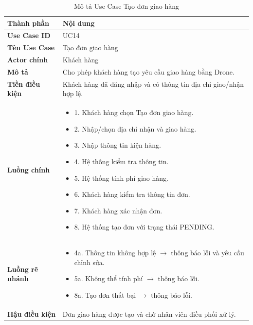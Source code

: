\begin{longtable}{|L{3cm}|L{11cm}|}

\caption{Mô tả Use Case Tạo đơn giao hàng}
\label{tab:mo-ta-uc14-tao-don}
\\
\hline
\textbf{Thành phần} & \textbf{Nội dung} \\
\hline
\textbf{Use Case ID} & UC14 \\
\hline
\textbf{Tên Use Case} & Tạo đơn giao hàng \\
\hline
\textbf{Actor chính} & Khách hàng \\
\hline
\textbf{Mô tả} & Cho phép khách hàng tạo yêu cầu giao hàng bằng Drone. \\
\hline
\textbf{Tiền điều kiện} & Khách hàng đã đăng nhập và có thông tin địa chỉ giao/nhận hợp lệ. \\
\hline
\textbf{Luồng chính} & \begin{itemize}[leftmargin=*,topsep=2pt,itemsep=2pt]
\item 1. Khách hàng chọn Tạo đơn giao hàng.
\item 2. Nhập/chọn địa chỉ nhận và giao hàng.
\item 3. Nhập thông tin kiện hàng.
\item 4. Hệ thống kiểm tra thông tin.
\item 5. Hệ thống tính phí giao hàng.
\item 6. Khách hàng kiểm tra thông tin đơn.
\item 7. Khách hàng xác nhận đơn.
\item 8. Hệ thống tạo đơn với trạng thái PENDING.
\end{itemize} \\
\hline
\textbf{Luồng rẽ nhánh} & \begin{itemize}[leftmargin=*,topsep=2pt,itemsep=2pt]
\item 4a. Thông tin không hợp lệ $\rightarrow$ thông báo lỗi và yêu cầu chỉnh sửa.
\item 5a. Không thể tính phí $\rightarrow$ thông báo lỗi.
\item 8a. Tạo đơn thất bại $\rightarrow$ thông báo lỗi.
\end{itemize} \\
\hline
\textbf{Hậu điều kiện} & Đơn giao hàng được tạo và chờ nhân viên điều phối xử lý. \\
\hline
\end{longtable}

